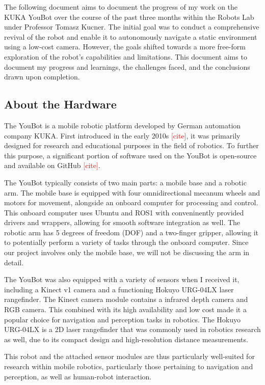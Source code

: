\documentclass[a4paper, 12pt]{article}
\newcommand{\adi}[1]{\textcolor{red}{#1}}
\begin{document}
    The following document aims to document the progress of my work on the KUKA YouBot over the course of the past three months within the Robots Lab under Professor Tomasz Kucner. The initial goal was to conduct a comprehensive revival of the robot and enable it to autonomously navigate a static environment using a low-cost camera. However, the goals shifted towards a more free-form exploration of the robot's capabilities and limitations. This document aims to document my progress and learnings, the challenges faced, and the conclusions drawn upon completion.

    \subsection{About the Hardware}

    The YouBot is a mobile robotic platform developed by German automation company KUKA. First introduced in the early 2010s \adi{[cite]}, it was primarily designed for research and educational purposes in the field of robotics. To further this purpose, a significant portion of software used on the YouBot is open-source and available on GitHub \adi{[cite]}. 

    The YouBot typically consists of two main parts: a mobile base and a robotic arm. The mobile base is equipped with four omnidirectional mecanum wheels and motors for movement, alongside an onboard computer for processing and control. This onboard computer uses Ubuntu and ROS1 with conveninently provided drivers and wrappers, allowing for smooth software integration as well. The robotic arm has 5 degrees of freedom (DOF) and a two-finger gripper, allowing it to potentially perform a variety of tasks through the onboard computer. Since our project involves only the mobile base, we will not be discussing the arm in detail.

    The YouBot was also equipped with a variety of sensors when I received it, including a Kinect v1 camera and a functioning Hokuyo URG-04LX laser rangefinder. The Kinect camera module contains a infrared depth camera and RGB camera. This combined with its high availability and low cost made it a popular choice for navigation and perception tasks in robotics. The Hokuyo URG-04LX is a 2D laser rangefinder that was commonly used in robotics research as well, due to its compact design and high-resolution distance measurements. 

    This robot and the attached sensor modules are thus particularly well-suited for research within mobile robotics, particularly those pertaining to navigation and perception, as well as human-robot interaction. 
\end{document}
